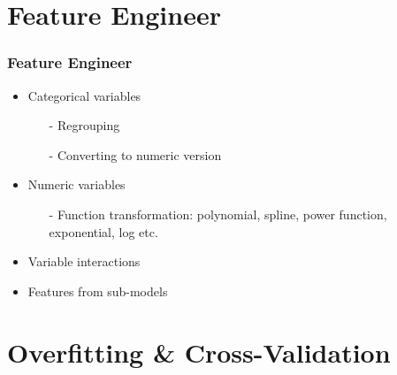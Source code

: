 \documentclass[notheorems, aspectratio=54, tikz,border=10pt,multi]{beamer}
\begin{document}
\section{Feature Engineer}
\begin{frame}
\frametitle{Feature Engineer}
\begin{itemize}
\item Categorical variables
      \begin{itemize}
        \item[-] Regrouping
        \item[-] Converting to numeric version
      \end{itemize}
\item Numeric variables
      \begin{itemize}
        \item[-] Function transformation: polynomial, spline, power function, exponential, log etc.
      \end{itemize}
      
\item Variable interactions
\item Features from sub-models
\end{itemize}
\end{frame}

\section{Overfitting \& Cross-Validation}
\end{document}
